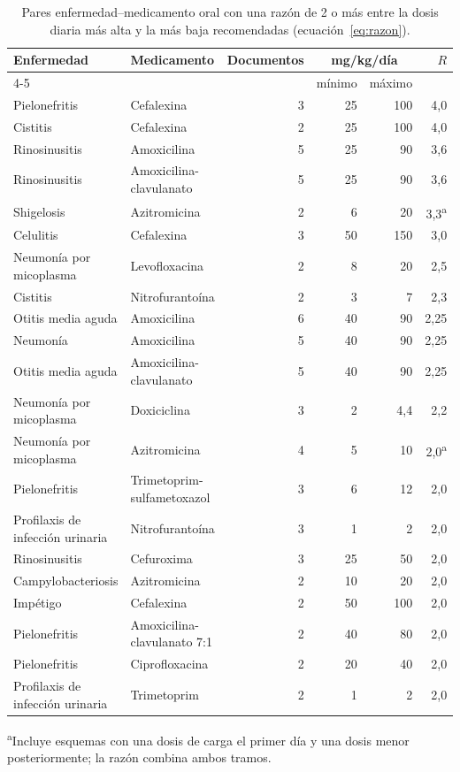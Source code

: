 \documentclass[11pt,a4paper]{article}
\begin{document}
\begin{table}[htbp]
\centering
\caption{Pares enfermedad--medicamento oral con una razón de 2 o más entre la dosis diaria más alta y la más baja recomendadas (ecuación~\ref{eq:razon}).}
\label{tab:discordancia}
\small
\begin{tabular}{@{}llrrrr@{}}
\toprule
Enfermedad & Medicamento & Documentos & \multicolumn{2}{c}{mg/kg/día} & $R$ \\
\cmidrule(lr){4-5}
& & & mínimo & máximo & \\
\midrule
Pielonefritis & Cefalexina & 3 & 25 & 100 & 4,0 \\
Cistitis & Cefalexina & 2 & 25 & 100 & 4,0 \\
Rinosinusitis & Amoxicilina & 5 & 25 & 90 & 3,6 \\
Rinosinusitis & Amoxicilina-clavulanato & 5 & 25 & 90 & 3,6 \\
Shigelosis & Azitromicina & 2 & 6 & 20 & 3,3\textsuperscript{a} \\
Celulitis & Cefalexina & 3 & 50 & 150 & 3,0 \\
Neumonía por micoplasma & Levofloxacina & 2 & 8 & 20 & 2,5 \\
Cistitis & Nitrofurantoína & 2 & 3 & 7 & 2,3 \\
Otitis media aguda & Amoxicilina & 6 & 40 & 90 & 2,25 \\
Neumonía & Amoxicilina & 5 & 40 & 90 & 2,25 \\
Otitis media aguda & Amoxicilina-clavulanato & 5 & 40 & 90 & 2,25 \\
Neumonía por micoplasma & Doxiciclina & 3 & 2 & 4,4 & 2,2 \\
Neumonía por micoplasma & Azitromicina & 4 & 5 & 10 & 2,0\textsuperscript{a} \\
Pielonefritis & Trimetoprim-sulfametoxazol & 3 & 6 & 12 & 2,0 \\
Profilaxis de infección urinaria & Nitrofurantoína & 3 & 1 & 2 & 2,0 \\
Rinosinusitis & Cefuroxima & 3 & 25 & 50 & 2,0 \\
Campylobacteriosis & Azitromicina & 2 & 10 & 20 & 2,0 \\
Impétigo & Cefalexina & 2 & 50 & 100 & 2,0 \\
Pielonefritis & Amoxicilina-clavulanato 7:1 & 2 & 40 & 80 & 2,0 \\
Pielonefritis & Ciprofloxacina & 2 & 20 & 40 & 2,0 \\
Profilaxis de infección urinaria & Trimetoprim & 2 & 1 & 2 & 2,0 \\
\bottomrule
\end{tabular}

\vspace{2pt}
\begin{minipage}{0.92\textwidth}\footnotesize
\textsuperscript{a}Incluye esquemas con una dosis de carga el primer día y una dosis menor posteriormente; la razón combina ambos tramos.
\end{minipage}
\end{table}
\end{document}
